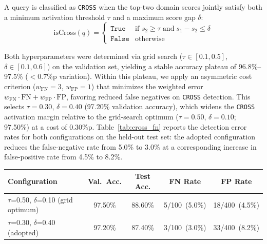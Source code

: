 \documentclass[a4paper,fleql]{cas-sc}
\begin{document}
A query is classified as \texttt{CROSS} when the top-two domain scores
jointly satisfy both a minimum activation threshold $\tau$ and a maximum
score gap $\delta$:
\begin{equation}
    \text{isCross}(q) =
    \begin{cases}
        \texttt{True}  & \text{if } s_2 \geq \tau \;\text{and}\;
                         s_1 - s_2 \leq \delta \\
        \texttt{False} & \text{otherwise}
    \end{cases}
    \label{eq:cross_detect}
\end{equation}

Both hyperparameters were determined via grid search
($\tau \in [0.1, 0.5]$, $\delta \in [0.1, 0.6]$) on the validation set,
yielding a stable accuracy plateau of 96.8\%--97.5\% ($<0.7$\%p variation).
Within this plateau, we apply an asymmetric cost criterion
($w_{\text{FN}}=3$, $w_{\text{FP}}=1$) that minimizes the weighted error
$w_{\text{FN}} \cdot \text{FN} + w_{\text{FP}} \cdot \text{FP}$, favoring
reduced false negatives on \texttt{CROSS} detection. This selects
$\tau = 0.30$, $\delta = 0.40$ (97.20\% validation accuracy), which widens
the \texttt{CROSS} activation margin relative to the grid-search optimum
($\tau = 0.50$, $\delta = 0.10$; 97.50\%) at a cost of 0.30\%p.
Table~\ref{tab:cross_fn} reports the detection error rates for both
configurations on the held-out test set: the adopted configuration reduces
the false-negative rate from 5.0\% to 3.0\% at a corresponding increase in
false-positive rate from 4.5\% to 8.2\%.

\vspace{6pt plus 4pt minus 3pt}
\begin{center}
\begingroup
{}
\label{tab:cross_fn}
\begin{tabular}{lcccc}
\toprule
\textbf{Configuration} & \textbf{Val.\ Acc.} & \textbf{Test Acc.} & \textbf{FN Rate} & \textbf{FP Rate} \\
\midrule
$\tau$=0.50, $\delta$=0.10 (grid optimum) & 97.50\% & 88.60\% & 5/100\ (5.0\%) & 18/400\ (4.5\%) \\
$\tau$=0.30, $\delta$=0.40 (adopted)      & 97.20\% & 87.40\% & 3/100\ (3.0\%) & 33/400\ (8.2\%) \\
\bottomrule
\end{tabular}
\endgroup
\end{center}
\vspace{6pt plus 4pt minus 3pt}
\end{document}
